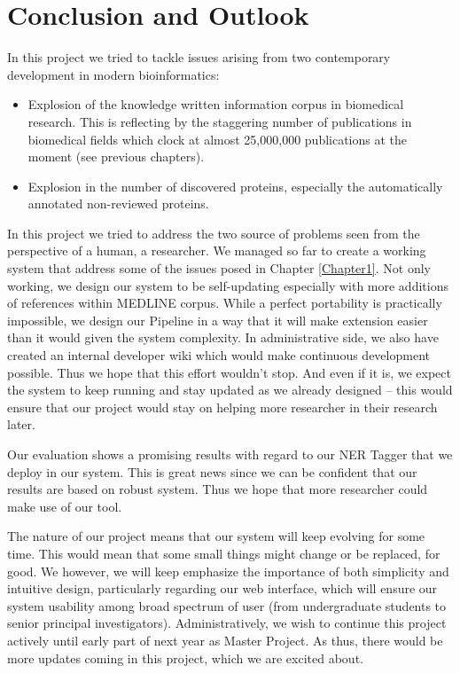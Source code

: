 
\chapter{Conclusion and Outlook} %

\label{Chapter8} %


In this project we tried to tackle issues arising from two contemporary development in modern bioinformatics:

\begin{itemize}
\item Explosion of the knowledge written information corpus in biomedical research. This is reflecting by the staggering number of publications in biomedical fields which clock at almost 25,000,000 publications at the moment (see previous chapters).

\item Explosion in the number of discovered proteins, especially the automatically annotated non-reviewed proteins.
\end{itemize}

In this project we tried to address the two source of problems seen from the perspective of a human, a researcher. We managed so far to create a working system that address some of the issues posed in Chapter \ref{Chapter1}. Not only working, we design our system to be self-updating especially with more additions of references within MEDLINE corpus. While a perfect portability is practically impossible, we design our Pipeline in a way that it will make extension easier than it would given the system complexity. In administrative side, we also have created an internal developer wiki which would make continuous development possible. Thus we hope that this effort wouldn't stop. And even if it is, we expect the system to keep running and stay updated as we already designed -- this would ensure that our project would stay on helping more researcher in their research later.

Our evaluation shows a promising results with regard to our NER Tagger that we deploy in our system. This is great news since we can be confident that our results are based on robust system. Thus we hope that more researcher could make use of our tool.

The nature of our project means that our system will keep evolving for some time. This would mean that some small things might change or be replaced, for good. We however, we will keep emphasize the importance of both simplicity and intuitive design, particularly regarding our web interface, which will ensure our system usability among broad spectrum of user (from undergraduate students to senior principal investigators). Administratively, we wish to continue this project actively until early part of next year as Master Project. As thus, there would be more updates coming in this project, which we are excited about.